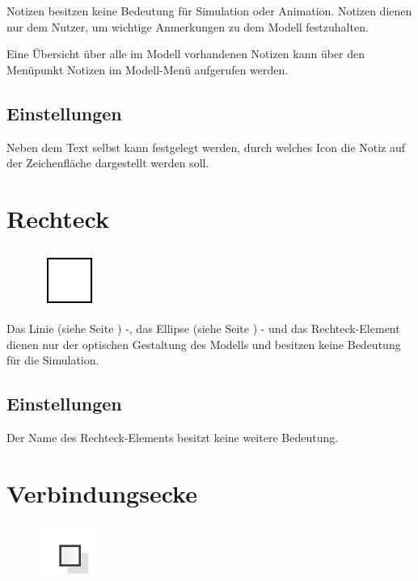 Notizen besitzen keine Bedeutung für Simulation oder Animation.
Notizen dienen nur dem Nutzer, um wichtige Anmerkungen zu dem Modell festzuhalten.

Eine Übersicht über alle im Modell vorhandenen Notizen kann über
den Menüpunkt Notizen im Modell-Menü
aufgerufen werden.

\subsection*{Einstellungen}

Neben dem Text selbst kann festgelegt werden, durch welches Icon die
Notiz auf der Zeichenfläche dargestellt werden soll.


\section{Rechteck}
\label{ref:ModelElementRectangle}

\begin{figure}
\vspace{-22pt}
\includegraphics[width=2cm]{imageModelElementRectangle.png}
\vspace{-22pt}
\end{figure}

Das Linie (siehe Seite \pageref{ref:ModelElementLine}) -, das Ellipse (siehe Seite \pageref{ref:ModelElementEllipse}) - und
das Rechteck-Element dienen nur der optischen Gestaltung des Modells und besitzen keine Bedeutung für die Simulation.

\subsection*{Einstellungen}

Der Name des Rechteck-Elements besitzt keine weitere Bedeutung.


\section{Verbindungsecke}
\label{ref:ModelElementVertex}

\begin{figure}
\vspace{-22pt}
\includegraphics[width=2cm]{imageModelElementVertex.png}
\vspace{-22pt}
\end{figure}

